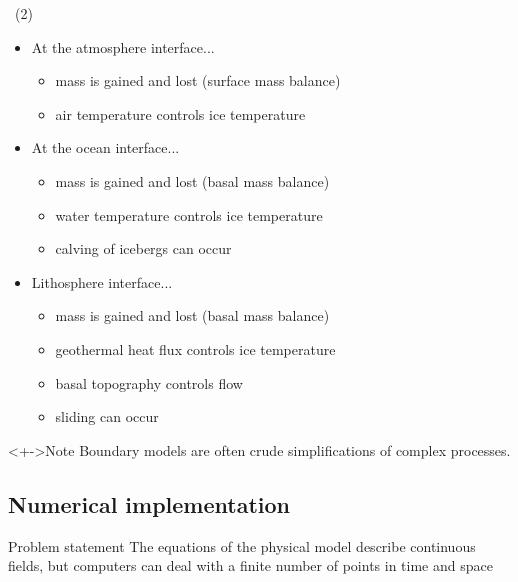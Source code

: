 \documentclass{beamer}
\begin{document}
\begin{frame}{\insertsubsection\ (2)}
	\begin{itemize}[<+->]
		\item At the atmosphere interface...
			\begin{itemize}
				\item mass is gained and lost (surface mass balance)
				\item air temperature controls ice temperature
			\end{itemize}
		\item At the ocean interface...
			\begin{itemize}
				\item mass is gained and lost (basal mass balance)
				\item water temperature controls ice temperature
				\item calving of icebergs can occur
			\end{itemize}
		\item Lithosphere interface...
			\begin{itemize}
				\item mass is gained and lost (basal mass balance)
				\item geothermal heat flux controls ice temperature
				\item basal topography controls flow
				\item sliding can occur
			\end{itemize}
	\end{itemize}
	\begin{block}<+->{Note}
		Boundary models are often crude simplifications of complex processes.
	\end{block}
\end{frame}

\subsection{Numerical implementation}

\begin{frame}{\insertsubsection}
	\begin{block}{Problem statement}
		The equations of the physical model describe \alert{continuous} fields, but computers can deal with a \alert{finite number of points} in time and space
	\end{block}
\end{frame}
\end{document}
